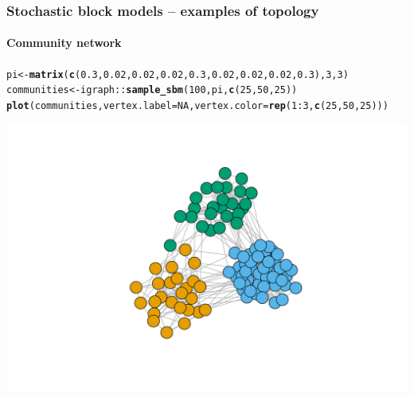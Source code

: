 \documentclass{beamer}\usepackage[]{graphicx}\usepackage[]{color}
\makeatletter
\newcommand{\hlnum}[1]{\textcolor[rgb]{0.686,0.059,0.569}{#1}}%
\newcommand{\hlopt}[1]{\textcolor[rgb]{0,0,0}{#1}}%
\newcommand{\hlstd}[1]{\textcolor[rgb]{0.345,0.345,0.345}{#1}}%
\newcommand{\hlkwb}[1]{\textcolor[rgb]{0.69,0.353,0.396}{#1}}%
\newcommand{\hlkwc}[1]{\textcolor[rgb]{0.333,0.667,0.333}{#1}}%
\newcommand{\hlkwd}[1]{\textcolor[rgb]{0.737,0.353,0.396}{\textbf{#1}}}%
\newenvironment{kframe}{%
 \def\at@end@of@kframe{}%
 \ifinner\ifhmode%
  \def\at@end@of@kframe{\end{minipage}}%
  \begin{minipage}{\columnwidth}%
 \fi\fi%
 \def\FrameCommand##1{\hskip\@totalleftmargin \hskip-\fboxsep
 \colorbox{shadecolor}{##1}\hskip-\fboxsep
     \hskip-\linewidth \hskip-\@totalleftmargin \hskip\columnwidth}%
 \MakeFramed {\advance\hsize-\width
   \@totalleftmargin\z@ \linewidth\hsize
   \@setminipage}}%
 {\par\unskip\endMakeFramed%
 \at@end@of@kframe}
\newenvironment{knitrout}{}{} %
\makeatother
\begin{document}
\begin{frame}[fragile]
  \frametitle{Stochastic block models -- examples of topology}
  \framesubtitle{Community network}

\begin{knitrout}\scriptsize
{}\color{fgcolor}\begin{kframe}
\begin{alltt}
\hlstd{pi} \hlkwb{<-} \hlkwd{matrix}\hlstd{(}\hlkwd{c}\hlstd{(}\hlnum{0.3}\hlstd{,}\hlnum{0.02}\hlstd{,}\hlnum{0.02}\hlstd{,}\hlnum{0.02}\hlstd{,}\hlnum{0.3}\hlstd{,}\hlnum{0.02}\hlstd{,}\hlnum{0.02}\hlstd{,}\hlnum{0.02}\hlstd{,}\hlnum{0.3}\hlstd{),}\hlnum{3}\hlstd{,}\hlnum{3}\hlstd{)}
\hlstd{communities} \hlkwb{<-} \hlstd{igraph}\hlopt{::}\hlkwd{sample_sbm}\hlstd{(}\hlnum{100}\hlstd{, pi,} \hlkwd{c}\hlstd{(}\hlnum{25}\hlstd{,} \hlnum{50}\hlstd{,} \hlnum{25}\hlstd{))}
\hlkwd{plot}\hlstd{(communities,} \hlkwc{vertex.label}\hlstd{=}\hlnum{NA}\hlstd{,} \hlkwc{vertex.color} \hlstd{=} \hlkwd{rep}\hlstd{(}\hlnum{1}\hlopt{:}\hlnum{3}\hlstd{,}\hlkwd{c}\hlstd{(}\hlnum{25}\hlstd{,} \hlnum{50}\hlstd{,} \hlnum{25}\hlstd{)))}
\end{alltt}
\end{kframe}
\includegraphics[width=.8\textwidth]{figures/unnamed-chunk-10-1} 
\end{knitrout}

\end{frame}
\end{document}
